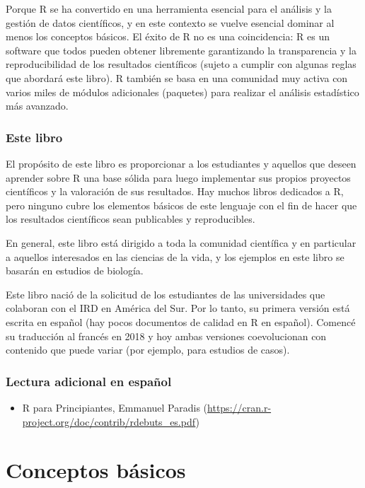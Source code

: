 \documentclass[
]{book}
\providecommand{\tightlist}{%
  \setlength{\itemsep}{0pt}\setlength{\parskip}{0pt}}
\begin{document}
Porque R se ha convertido en una herramienta esencial para el análisis y la gestión de datos científicos, y en este contexto se vuelve esencial dominar al menos los conceptos básicos. El éxito de R no es una coincidencia: R es un software que todos pueden obtener libremente garantizando la transparencia y la reproducibilidad de los resultados científicos (sujeto a cumplir con algunas reglas que abordará este libro). R también se basa en una comunidad muy activa con varios miles de módulos adicionales (paquetes) para realizar el análisis estadístico más avanzado.

\hypertarget{este-libro}{%
\section{Este libro}\label{este-libro}}

El propósito de este libro es proporcionar a los estudiantes y aquellos que deseen aprender sobre R una base sólida para luego implementar sus propios proyectos científicos y la valoración de sus resultados. Hay muchos libros dedicados a R, pero ninguno cubre los elementos básicos de este lenguaje con el fin de hacer que los resultados científicos sean publicables y reproducibles.

En general, este libro está dirigido a toda la comunidad científica y en particular a aquellos interesados en las ciencias de la vida, y los ejemplos en este libro se basarán en estudios de biología.

Este libro nació de la solicitud de los estudiantes de las universidades que colaboran con el IRD en América del Sur. Por lo tanto, su primera versión está escrita en español (hay pocos documentos de calidad en R en español). Comencé su traducción al francés en 2018 y hoy ambas versiones coevolucionan con contenido que puede variar (por ejemplo, para estudios de casos).

\hypertarget{lectura-adicional-en-espauxf1ol}{%
\section{Lectura adicional en español}\label{lectura-adicional-en-espauxf1ol}}

\begin{itemize}
\tightlist
\item
  R para Principiantes, Emmanuel Paradis (\url{https://cran.r-project.org/doc/contrib/rdebuts_es.pdf})
\end{itemize}

\hypertarget{part-conceptos-buxe1sicos}{%
\part{Conceptos básicos}\label{part-conceptos-buxe1sicos}}
\end{document}
